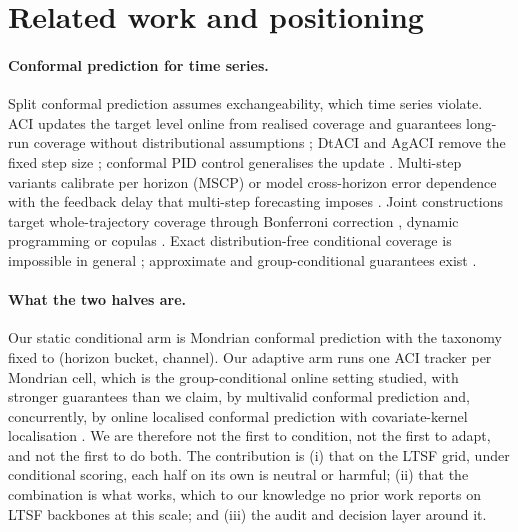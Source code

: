 \documentclass[11pt]{article}
\begin{document}
\section{Related work and positioning}\label{sec:related}

\paragraph{Conformal prediction for time series.} Split conformal prediction \citep{papadopoulos2002,lei2018} assumes exchangeability, which time series violate. ACI updates the target level online from realised coverage and guarantees long-run coverage without distributional assumptions \citep{aci}; DtACI and AgACI remove the fixed step size \citep{dtaci,agaci}; conformal PID control generalises the update \citep{cpid}. Multi-step variants calibrate per horizon (MSCP) or model cross-horizon error dependence with the feedback delay that multi-step forecasting imposes \citep{acmcp,o2cp}. Joint constructions target whole-trajectory coverage through Bonferroni correction \citep{cfrnn}, dynamic programming \citep{bellman} or copulas \citep{copulacpts}. Exact distribution-free conditional coverage is impossible in general \citep{vovk2012,leiwasserman2014,barber2021}; approximate and group-conditional guarantees exist \citep{gcc}.

\paragraph{What the two halves are.} Our static conditional arm is Mondrian conformal prediction \citep{mondrian} with the taxonomy fixed to (horizon bucket, channel). Our adaptive arm runs one ACI tracker per Mondrian cell, which is the group-conditional online setting studied, with stronger guarantees than we claim, by multivalid conformal prediction \citep{mvp} and, concurrently, by online localised conformal prediction with covariate-kernel localisation \citep{olcp}. We are therefore not the first to condition, not the first to adapt, and not the first to do both. The contribution is (i) that on the LTSF grid, under conditional scoring, each half on its own is neutral or harmful; (ii) that the combination is what works, which to our knowledge no prior work reports on LTSF backbones at this scale; and (iii) the audit and decision layer around it.
\end{document}
